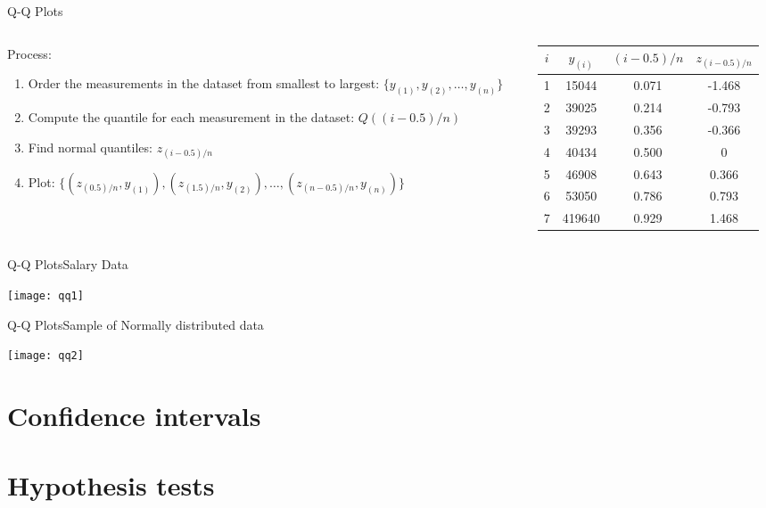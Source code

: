\documentclass[xcolor=dvipsnames]{beamer}
\begin{document}
\begin{frame}{Q-Q Plots}
\begin{columns}
	\begin{column}{.45 \textwidth}
Process:
			\begin{enumerate}
				\item Order the measurements in the dataset from smallest to largest: $\{y_{(1)}, y_{(2)}, \hdots, y_{(n)} \}$
				\item Compute the quantile for each measurement in the dataset: $Q((i-0.5) /n)$
				\item Find normal quantiles: $z_{(i-0.5)/n}$
				\item Plot: $\{(z_{(0.5)/n}, y_{(1)}),(z_{(1.5)/n}, y_{(2)}),\hdots, (z_{(n-0.5)/n}, y_{(n)})\}$
			\end{enumerate}
	\end{column}
	\begin{column}{0.5 \textwidth}
		\vspace{-20pt}
		\begin{center}
			\begin{tabular}{|c|c|c|c|}
				\hline 
				$i$ & $y_{(i)}$ & $(i-0.5)/n$ & $z_{(i-0.5)/n}$ \\
				\hline \hline
				1 & 15044 & 0.071 & -1.468 \\ \hline
				2 & 39025 & 0.214 & -0.793 \\ \hline
				3 & 39293 & 0.356 & -0.366 \\ \hline
				4 & 40434 & 0.500 & 0 \\ \hline
				5 & 46908 & 0.643 & 0.366 \\ \hline
				6 & 53050 & 0.786 & 0.793 \\ \hline
				7 & 419640 & 0.929 & 1.468 \\ \hline
			\end{tabular}
		\end{center}
	\end{column}
\end{columns}

\end{frame}

\begin{frame}{Q-Q Plots}{Salary Data}
	\begin{center}
		\texttt{[image: qq1]}
	\end{center}
\end{frame}

\begin{frame}{Q-Q Plots}{Sample of Normally distributed data}
\begin{center}
	\texttt{[image: qq2]}
\end{center}
\end{frame}

\section{Confidence intervals}

\section{Hypothesis tests}
\end{document}
